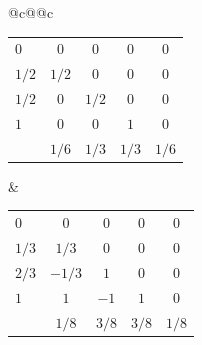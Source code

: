 \begin{table}[!h]
\centering
\begin{tabular}{@{\hspace{2em}}c@{}@{\hspace{10em}}c}
\begin{tabular}{l|cccc}
$0$      &  $0$    & $0$   &  $0$   & $0$              \\
$1/2$    &  $1/2$  & $0$   &  $0$   & $0$              \\
$1/2$    &  $0$    & $1/2$ &  $0$   & $0$              \\
$1$      &  $0$    & $0$   &  $1$   & $0$              \\
\hline
         &  $1/6$  & $1/3$ &  $1/3$ & $1/6$              
\end{tabular} &
\begin{tabular}{l|cccc}
$0$      &  $0$    & $0$   &  $0$   & $0$              \\
$1/3$    &  $1/3$  & $0$   &  $0$   & $0$              \\
$2/3$    &  $-1/3$ & $1$   &  $0$   & $0$              \\
$1$      &  $1$    & $-1$  &  $1$   & $0$              \\
\hline
         &  $1/8$  & $3/8$ &  $3/8$ & $1/8$              
\end{tabular}
\end{tabular}
\end{table}

